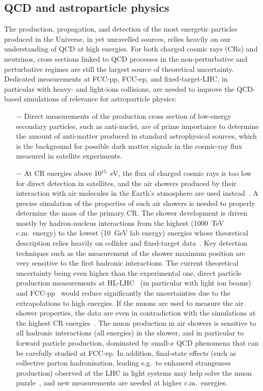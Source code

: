 \subsection{QCD and astroparticle physics}
The production, propagation, and detection of the most energetic particles produced in the Universe, in yet unravelled sources, relies heavily on our understanding of QCD at high energies. For both charged cosmic rays (CRs) and neutrinos, cross sections linked to QCD processes in the non-perturbative and perturbative regimes are still the largest source of theoretical uncertainty. Dedicated measurements at FCC-pp, FCC-ep, and fixed-target-LHC, in particular with heavy- and light-ions collisions, are needed to improve the QCD-based simulations of relevance for astroparticle physics:
\begin{itemize}
\item [$-$] Direct measurements of the production cross section of low-energy secondary particles, such as anti-nuclei, are of prime importance to determine the amount of anti-matter produced in standard astrophysical sources, which is the background for possible dark matter signals in the cosmic-ray flux measured in satellite experiments.
\item [$-$] At CR energies above 10$^{15}$~eV, the flux of charged cosmic rays is too low for direct detection in satellites, and the air showers produced by their interaction with air molecules in the Earth's atmosphere are used instead~\cite{Kampert:2012mx}. A precise simulation of the properties of such air showers is needed to properly determine the mass of the primary CR. The shower development is driven mostly by hadron-nucleus interactions from the highest (1000~TeV c.m.\ energy) to the lowest (10~GeV lab energy) energies whose theoretical description relies heavily on collider and fixed-target data~\cite{dEnterria:2011twh}. Key detection techniques such as the measurement of the shower maximum position are very sensitive to the first hadronic interactions. The current theoretical uncertainty being even higher than the experimental one, direct particle production measurements at HL-LHC~\cite{Citron:2018lsq} (in particular with light ion beams) and FCC-pp~\cite{Mangano:2016jyj,dEnterria:2016oxo} would reduce significantly the uncertainties due to the extrapolations to high energies. If the muons are used to measure the air shower properties, the data are even in contradiction with the simulations %
at the highest CR energies~\cite{Dembinski:2019uta}. The muon production in air showers is sensitive to all hadronic interactions (all energies) in the shower, and in particular to forward particle production, dominated by small-$x$ QCD phenomena that can be carefully studied at FCC-ep. In addition, final-state effects (such as collective parton hadronisation, leading e.g.\ to enhanced strangeness production) observed at the LHC in light systems may help solve the muon puzzle~\cite{Pierog:2019}, and new measurements are needed at higher c.m.\ energies.
\end{itemize}

